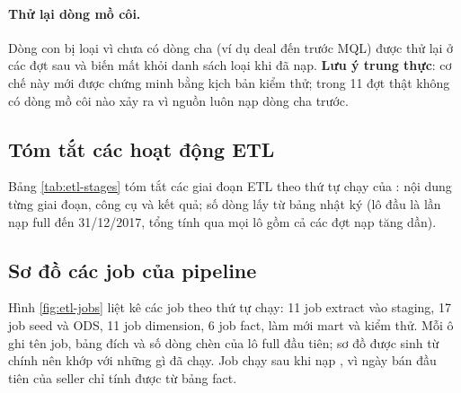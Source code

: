 
\paragraph{Thử lại dòng mồ côi.} Dòng con bị loại vì chưa có dòng cha (ví dụ deal đến trước MQL) được thử lại ở các đợt sau và biến mất khỏi danh sách loại khi đã nạp. \textbf{Lưu ý trung thực}: cơ chế này mới được chứng minh bằng kịch bản kiểm thử; trong 11 đợt thật không có dòng mồ côi nào xảy ra vì nguồn luôn nạp dòng cha trước.

\subsection{Tóm tắt các hoạt động ETL}\label{sec:etl-tom-tat}
Bảng \ref{tab:etl-stages} tóm tắt các giai đoạn ETL theo thứ tự chạy của : nội dung từng giai đoạn, công cụ và kết quả; số dòng lấy từ bảng nhật ký  (lô đầu là lần nạp full đến 31/12/2017, tổng tính qua mọi lô gồm cả các đợt nạp tăng dần).


\subsection{Sơ đồ các job của pipeline}\label{sec:etl-jobs}
Hình \ref{fig:etl-jobs} liệt kê các job theo thứ tự chạy: 11 job extract vào staging, 17 job seed và ODS, 11 job dimension, 6 job fact, làm mới mart và kiểm thử. Mỗi ô ghi tên job, bảng đích và số dòng chèn của lô full đầu tiên; sơ đồ được sinh từ chính  nên khớp với những gì đã chạy. Job  chạy sau khi nạp , vì ngày bán đầu tiên của seller chỉ tính được từ bảng fact.

